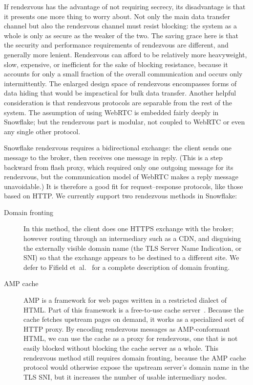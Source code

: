 \documentclass[letterpaper,twocolumn]{article}
\begin{document}
If rendezvous has the advantage of not requiring secrecy,
its disadvantage is that it presents one more thing to worry about.
Not only the main data transfer channel
but also the rendezvous channel must resist blocking:
the system as a whole is only as secure as the weaker of the two.
The saving grace here is that the security and performance requirements
of rendezvous are different, and generally more lenient.
Rendezvous can afford to be relatively more heavyweight,
slow, expensive, or inefficient for the sake of blocking resistance,
because it accounts for only a small fraction of the overall communication
and occurs only intermittently.
The enlarged design space of rendezvous encompasses
forms of data hiding that would be impractical
for bulk data transfer.
Another helpful consideration is that rendezvous protocols
are separable from the rest of the system.
The assumption of using WebRTC is embedded fairly deeply in Snowflake;
but the rendezvous part is modular,
not coupled to WebRTC or even any single other protocol.

Snowflake rendezvous requires a bidirectional exchange:
the client sends one message to the broker, then receives
one message in reply.
(This is a step backward from flash proxy,
which required only one outgoing message for its rendezvous,
but the communication model of WebRTC makes a reply message unavoidable.)
It is therefore a good fit for request--response protocols,
like those based on HTTP.
We currently support two rendezvous methods in Snowflake:

\begin{description}
\item[Domain fronting]
In this method, the client does one HTTPS exchange
with the broker; however routing through an intermediary such as a CDN,
and disguising the externally visible domain name
(the TLS Server Name Indication, or SNI) so that the exchange
appears to be destined to a different site.
We defer to Fifield et~al.~\cite{Fifield2015a}
for a complete description of domain fronting.
\item[AMP cache]
AMP is a framework for web pages written in a restricted dialect of HTML.
Part of this framework is a free-to-use
cache server~\cite{amp-cache}.
Because the cache fetches upstream pages on demand,
it works as a specialized sort of HTTP proxy.
By encoding rendezvous messages as AMP-conformant HTML,
we can use the cache as a proxy for rendezvous,
one that is not easily blocked without blocking the cache server as a whole.
This rendezvous method still requires domain fronting,
because the AMP cache protocol would otherwise expose the
upstream server's domain name in the TLS SNI,
but it increases the number of usable intermediary nodes.
\end{description}
\end{document}
